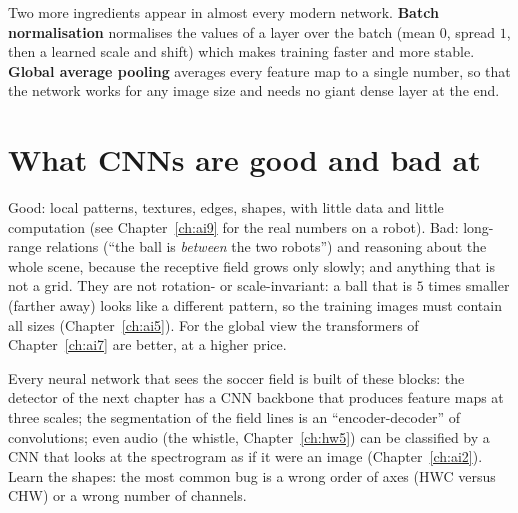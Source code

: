 Two more ingredients appear in almost every modern network. \textbf{Batch normalisation} normalises the values of a layer over the batch (mean $0$, spread $1$, then a learned scale and shift) which makes training faster and more stable. \textbf{Global average pooling} averages every feature map to a single number, so that the network works for any image size and needs no giant dense layer at the end.

\section*{What CNNs are good and bad at}
Good: local patterns, textures, edges, shapes, with little data and little computation (see Chapter~\ref{ch:ai9} for the real numbers on a robot). Bad: long-range relations (``the ball is \emph{between} the two robots'') and reasoning about the whole scene, because the receptive field grows only slowly; and anything that is not a grid. They are not rotation- or scale-invariant: a ball that is $5$ times smaller (farther away) looks like a different pattern, so the training images must contain all sizes (Chapter~\ref{ch:ai5}). For the global view the transformers of Chapter~\ref{ch:ai7} are better, at a higher price.

\begin{aibox}
Every neural network that sees the soccer field is built of these blocks: the detector of the next chapter has a CNN backbone that produces feature maps at three scales; the segmentation of the field lines is an ``encoder-decoder'' of convolutions; even audio (the whistle, Chapter~\ref{ch:hw5}) can be classified by a CNN that looks at the spectrogram as if it were an image (Chapter~\ref{ch:ai2}). Learn the shapes: the most common bug is a wrong order of axes (HWC versus CHW) or a wrong number of channels.
\end{aibox}


